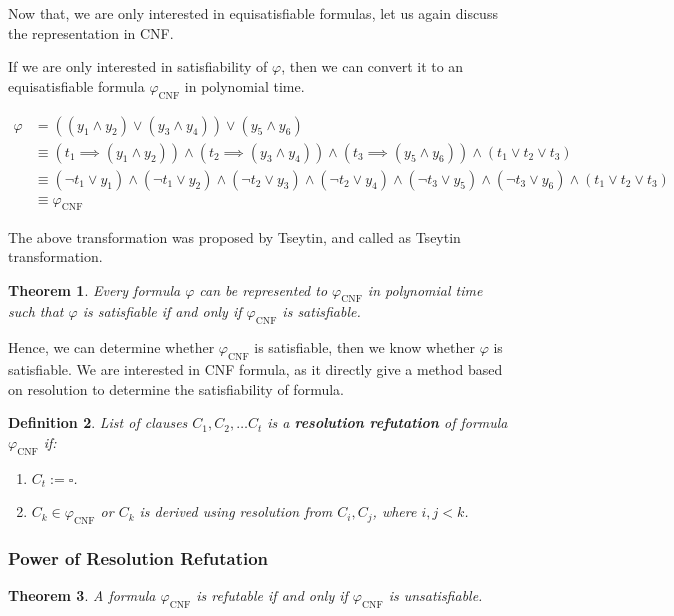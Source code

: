 \documentclass{article}
\newtheorem{theorem}{Theorem}
\newtheorem{definition}[theorem]{Definition}
\begin{document}
Now that, we are only interested in equisatisfiable formulas, let us again discuss the representation in CNF.

If we are only interested in satisfiability of $\varphi$, then we can convert it to an equisatisfiable formula $\varphi_{\text{CNF}}$ in polynomial time.

\begin{align*}
\varphi &= ((y_1 \land y_2) \lor (y_3 \land y_4)) \lor (y_5 \land y_6)\\
&\equiv (t_1 \implies (y_1 \land y_2)) \land (t_2 \implies (y_3 \land y_4)) \land (t_3 \implies (y_5 \land y_6)) \land (t_1 \lor t_2 \lor t_3)\\
&\equiv (\lnot t_1 \lor y_1) \land (\lnot t_1 \lor y_2) \land (\lnot t_2 \lor y_3) \land (\lnot t_2 \lor y_4) \land (\lnot t_3 \lor y_5 ) \land (\lnot t_3 \lor y_6) \land (t_1 \lor t_2 \lor t_3)\\
&\equiv \varphi_{\text{CNF}}
\end{align*}

The above transformation was proposed by Tseytin, and called as Tseytin transformation.
\begin{theorem}
	Every formula $\varphi$ can be represented to $\varphi_{\text{CNF}}$ in polynomial time such that $\varphi$ is satisfiable if and only if $\varphi_{\text{CNF}}$ is satisfiable.
\end{theorem}

Hence, we can determine whether $\varphi_{\text{CNF}}$ is satisfiable, then we know whether $\varphi$ is satisfiable. We are interested in CNF formula, as it directly give a method based on resolution to determine the satisfiability of formula.

\begin{definition}
	List of clauses $C_1, C_2,\ldots C_{t}$ is a \textbf{resolution refutation} of formula $\varphi_{\text{CNF}}$ if:
	\begin{enumerate}
		\item $C_t := \square$.
		\item $C_k \in \varphi_{\text{CNF}}$ or $C_k$ is derived using resolution from $C_i, C_j$, where $i,j < k$.
	\end{enumerate}
\end{definition}

\subsubsection{Power of Resolution Refutation}
\begin{theorem}
	\label{theorem:resolution_proof}
	A formula $\varphi_{\text{CNF}}$ is refutable if and only if $\varphi_{\text{CNF}}$ is unsatisfiable.
\end{theorem}
\end{document}
